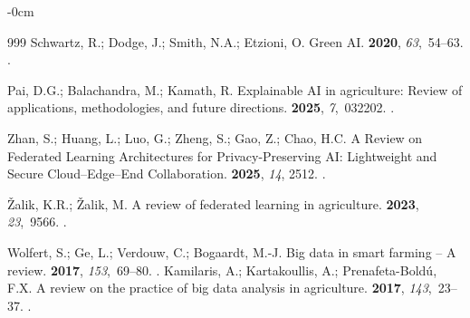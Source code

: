 \documentclass[land,review,accept,pdftex,oneauthor]{Definitions/mdpi}
\begin{document}
\begin{adjustwidth}{-\extralength}{0cm}
\begin{thebibliography}{999}
Schwartz, R.; Dodge, J.; Smith, N.A.; Etzioni, O.
\newblock Green {AI}.
 {\bf 2020}, {\em 63},~54--63.
.

Pai, D.G.; Balachandra, M.; Kamath, R.
\newblock Explainable AI in agriculture: Review of applications, methodologies,
  and future directions.
 {\bf 2025}, {\em 7},~032202.
.

Zhan, S.; Huang, L.; Luo, G.; Zheng, S.; Gao, Z.; Chao, H.C.
\newblock A Review on Federated Learning Architectures for Privacy-Preserving
  AI: Lightweight and Secure Cloud--Edge--End Collaboration.
 {\bf 2025}, {\em 14}, 2512.
.

\v{Z}alik, K.R.; \v{Z}alik, M.
\newblock A review of federated learning in agriculture.
 {\bf 2023}, {\em 23},~9566.
.

Wolfert, S.; Ge, L.; Verdouw, C.; Bogaardt, M.-J.
\newblock Big data in smart farming -- A review.
 {\bf 2017}, {\em 153},~69--80.
.
Kamilaris, A.; Kartakoullis, A.; Prenafeta-Bold\'u, F.X.
\newblock A review on the practice of big data analysis in agriculture.
 {\bf 2017}, {\em 143},~23--37.
.
\end{thebibliography}

\PublishersNote{}
\end{adjustwidth}
\end{document}
